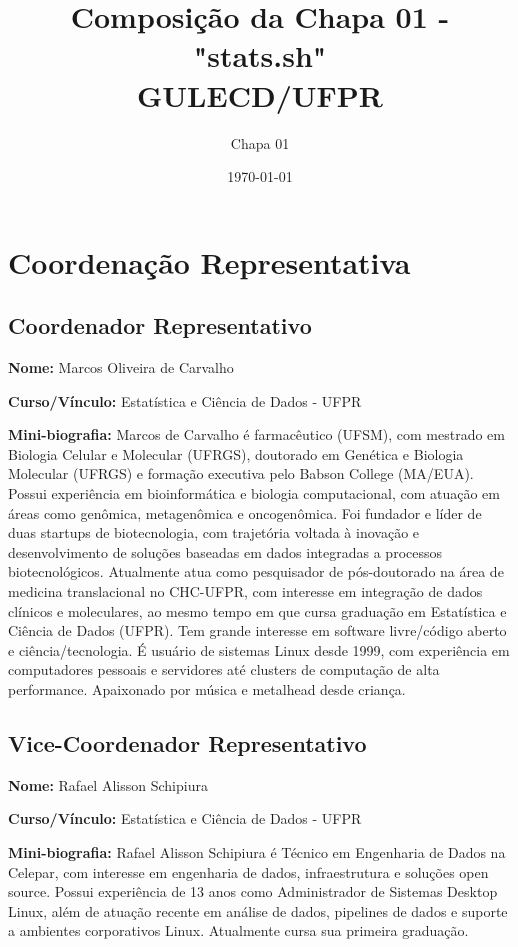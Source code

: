 \documentclass[11pt,a4paper]{article}
\title{\textbf{Composição da Chapa 01 - "stats.sh" \\ GULECD/UFPR}}
\author{Chapa 01}
\date{\today}
\begin{document}
\maketitle

\section{Coordenação Representativa}

\subsection{Coordenador Representativo}

\textbf{Nome:} Marcos Oliveira de Carvalho

\textbf{Curso/Vínculo:} Estatística e Ciência de Dados - UFPR

\textbf{Mini-biografia:}  
Marcos de Carvalho é farmacêutico (UFSM), com mestrado em Biologia Celular e Molecular (UFRGS), doutorado em Genética e Biologia Molecular (UFRGS) e formação executiva pelo Babson College (MA/EUA). Possui experiência em bioinformática e biologia computacional, com atuação em áreas como genômica, metagenômica e oncogenômica. Foi fundador e líder de duas startups de biotecnologia, com trajetória voltada à inovação e desenvolvimento de soluções baseadas em dados integradas a processos biotecnológicos. Atualmente atua como pesquisador de pós-doutorado na área de medicina translacional no CHC-UFPR, com interesse em integração de dados clínicos e moleculares, ao mesmo tempo em que cursa graduação em Estatística e Ciência de Dados (UFPR). Tem grande interesse em software livre/código aberto e ciência/tecnologia. É usuário de sistemas Linux desde 1999, com experiência em computadores pessoais e servidores até clusters de computação de alta performance. Apaixonado por música e metalhead desde criança.

\vspace{1em}

\subsection{Vice-Coordenador Representativo}

\textbf{Nome:} Rafael Alisson Schipiura

\textbf{Curso/Vínculo:} Estatística e Ciência de Dados - UFPR

\textbf{Mini-biografia:}  
Rafael Alisson Schipiura é Técnico em Engenharia de Dados na Celepar, com interesse em engenharia de dados, infraestrutura e soluções open source. Possui experiência de 13 anos como Administrador de Sistemas Desktop Linux, além de atuação recente em análise de dados, pipelines de dados e suporte a ambientes corporativos Linux. Atualmente cursa sua primeira graduação.
\end{document}
